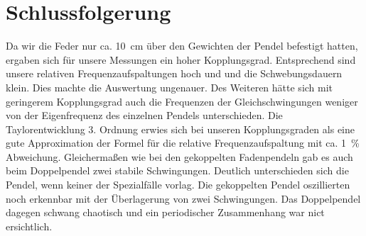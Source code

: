 \documentclass[
	a4paper,
	12pt,
	pagesize,
	ngerman
]{scrartcl}
\begin{document}
	\section{Schlussfolgerung}
	Da wir die Feder nur ca. \SI{10}{cm} über den Gewichten der Pendel befestigt hatten, ergaben sich für unsere Messungen ein hoher Kopplungsgrad. Entsprechend sind unsere relativen Frequenzaufspaltungen hoch und und die Schwebungsdauern klein.  Dies machte die Auswertung ungenauer. Des Weiteren hätte sich mit geringerem Kopplungsgrad auch die Frequenzen der Gleichschwingungen weniger von der Eigenfrequenz des einzelnen Pendels unterschieden.
	Die Taylorentwicklung 3. Ordnung erwies sich bei unseren Kopplungsgraden als eine gute Approximation der Formel für die relative Frequenzaufspaltung mit ca. \SI{1}{\%} Abweichung.
	Gleichermaßen wie bei den gekoppelten Fadenpendeln gab es auch beim Doppelpendel zwei stabile Schwingungen. Deutlich unterschieden sich die Pendel, wenn keiner der Spezialfälle vorlag. Die gekoppelten Pendel oszillierten noch erkennbar mit der Überlagerung von zwei Schwingungen. Das Doppelpendel dagegen schwang chaotisch und ein periodischer Zusammenhang war nict ersichtlich.
	
\end{document}
